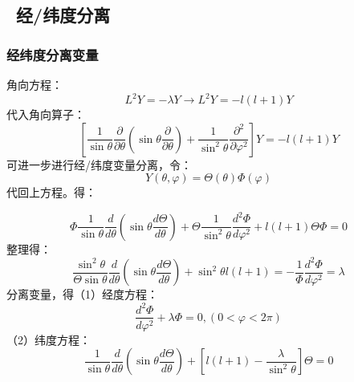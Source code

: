 \subsection{ 经/纬度分离}

\begin{frame}
	\frametitle{经纬度分离变量}
	角向方程：
	\begin{equation*}
		L^2 Y=-\lambda Y  \to  L^2 Y=-l(l+1) Y 
	\end{equation*}	
	代入角向算子：
	\begin{equation*}
		\left[ \frac{1}{ \sin \theta  } \frac{\partial }{\partial \theta } (\sin \theta \frac{\partial }{\partial \theta } )
		+\frac{1}{ \sin^2 \theta  } \frac{\partial^2}{\partial\varphi ^2} \right] Y=-l(l+1) Y 
	\end{equation*}	
	可进一步进行经/纬度变量分离，令：
	\begin{equation*}
		Y(\theta,\varphi)= \Theta(\theta) \Phi(\varphi)
	\end{equation*}	
	代回上方程。得：
\end{frame}	

\begin{frame}
	\begin{equation*}
		\Phi \frac{1}{\sin \theta} \frac{d}{d \theta}\left(\sin \theta \frac{d \Theta}{d \theta}\right)+\Theta \frac{1}{\sin ^{2} \theta} \frac{d^{2} \Phi}{d \varphi^{2}}+l(l+1) \Theta \Phi=0
	\end{equation*}	
	整理得：
	\begin{equation*}
		\frac{\sin ^{2} \theta}{\Theta \sin \theta} \frac{d}{d \theta}\left(\sin \theta \frac{d \Theta}{d \theta}\right)+\sin ^{2} \theta l(l+1)=-\frac{1}{\Phi} \frac{d^{2} \Phi}{d \varphi^{2}}=\lambda
	\end{equation*}	
	分离变量，得（1）经度方程：
	\begin{equation*}
		\frac{d^{2} \Phi}{d \varphi^{2}}+\lambda \Phi=0,(0<\varphi<2 \pi)
	\end{equation*}	
	（2）纬度方程：
	\begin{equation*}
		\frac{1}{\sin \theta} \frac{d}{d \theta}\left(\sin \theta \frac{d \Theta}{d \theta}\right)+\left[l(l+1)-\frac{\lambda}{\sin ^{2} \theta}\right] \Theta=0
	\end{equation*}	
\end{frame}	

